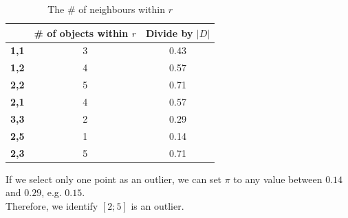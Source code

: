 \documentclass[aspectratio=169, 10pt]{beamer}
\begin{document}
\begin{frame}[t]
\begin{columns}[t]
\begin{column}{0.5\textwidth}
            \begin{table}[]
                \scriptsize
                \begin{tabular}{c|c|c}
                             &  \textbf{\# of objects within $r$} & \textbf{Divide by $|D|$}\\ \hline
                \textbf{1,1} &  3 & 0.43 \\
                \textbf{1,2} &  4 & 0.57 \\
                \textbf{2,2} &  5 & 0.71 \\
                \textbf{2,1} &  4 & 0.57 \\
                \textbf{3,3} &  2 & 0.29 \\
                \rowcolor[HTML]{34CDF9}\textbf{2,5} &  1 & 0.14 \\
                \textbf{2,3} &  5 & 0.71   
                \end{tabular}
                \caption{The \# of neighbours within $r$}
            \end{table}

            If we select only one point as an outlier, we can set $\pi$ to any value between $0.14$ and $0.29$, e.g. $0.15$.\\
            Therefore, we identify $[2;5]$ is an outlier.\\            
        \end{column}
    \end{columns}
\end{frame}
\end{document}

